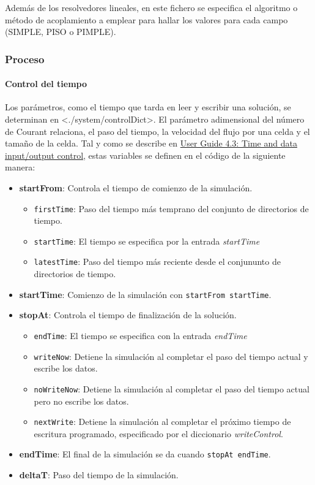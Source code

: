 Además de los resolvedores lineales, en este fichero se especifica el
algoritmo o método de acoplamiento a emplear para hallar los valores
para cada campo (SIMPLE, PISO o PIMPLE).

\subsubsection{Proceso}\label{header-n250}

\paragraph{Control del tiempo}\label{header-n253}

Los parámetros, como el tiempo que tarda en leer y escribir una
solución, se determinan en
\textless{}./system/controlDict\textgreater{}. El parámetro adimensional
del número de Courant relaciona, el paso del tiempo, la velocidad del
flujo por una celda y el tamaño de la celda. Tal y como se describe en
\href{https://cfd.direct/openfoam/user-guide/controlDict\#x18-1370004.3}{User
Guide 4.3: Time and data input/output control}, estas variables se
definen en el código de la siguiente manera:

\begin{itemize}
\item
  \textbf{startFrom}: Controla el tiempo de comienzo de la simulación.

  \begin{itemize}
  \item
    \texttt{firstTime}: Paso del tiempo más temprano del conjunto de
    directorios de tiempo.
  \item
    \texttt{startTime}: El tiempo se especifica por la entrada
    \emph{startTime}
  \item
    \texttt{latestTime}: Paso del tiempo más reciente desde el
    conjununto de directorios de tiempo.
  \end{itemize}
\item
  \textbf{startTime}: Comienzo de la simulación con
  \texttt{startFrom\ startTime}.
\item
  \textbf{stopAt}: Controla el tiempo de finalización de la solución.

  \begin{itemize}
  \item
    \texttt{endTime}: El tiempo se especifica con la entrada
    \emph{endTime}
  \item
    \texttt{writeNow}: Detiene la simulación al completar el paso del
    tiempo actual y escribe los datos.
  \item
    \texttt{noWriteNow}: Detiene la simulación al completar el paso del
    tiempo actual pero no escribe los datos.
  \item
    \texttt{nextWrite}: Detiene la simulación al completar el próximo
    tiempo de escritura programado, especificado por el diccionario
    \emph{writeControl}.
  \end{itemize}
\item
  \textbf{endTime}: El final de la simulación se da cuando
  \texttt{stopAt\ endTime}.
\item
  \textbf{deltaT}: Paso del tiempo de la simulación.
\end{itemize}

